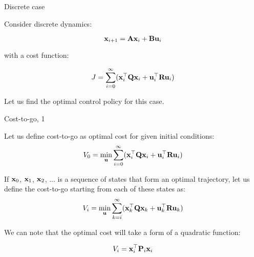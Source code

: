 \documentclass{beamer}
\begin{document}
\begin{frame}{Discrete case}
	\begin{flushleft}
		
		Consider discrete dynamics:
		
		\begin{equation}
			\mathbf{x}_{i+1} = \mathbf{A}\mathbf{x}_i + \mathbf{B}\mathbf{u}_i
		\end{equation}
		
		with a cost function:
		
		\begin{equation}
			J = \sum_{i=0}^\infty (\mathbf{x}_i^\top \mathbf{Q} \mathbf{x}_i +  \mathbf{u}_i^\top \mathbf{R} \mathbf{u}_i)
		\end{equation}
		
		Let us find the optimal control policy for this case.
		
		
	\end{flushleft}
\end{frame}



\begin{frame}{Cost-to-go, 1}
	\begin{flushleft}
		
		Let us define cost-to-go as optimal cost for given initial conditions:
		\begin{equation}
			V_0 = \underset{\mathbf{u}}{\text{min}} \sum_{i=0}^\infty (\mathbf{x}_i^\top \mathbf{Q} \mathbf{x}_i +  \mathbf{u}_i^\top \mathbf{R} \mathbf{u}_i)
		\end{equation}
		
		If $\mathbf{x}_0$, $\mathbf{x}_1$, $\mathbf{x}_2$, ... is a sequence of states that form an optimal trajectory, let us define the cost-to-go starting from each of these states as:
		\begin{equation}
			V_i =  \underset{\mathbf{u}}{\text{min}} \sum_{k = i}^\infty (\mathbf{x}_k^\top \mathbf{Q} \mathbf{x}_k +  \mathbf{u}_k^\top \mathbf{R} \mathbf{u}_k)
		\end{equation}
		
		We can note that the optimal cost will take a form of a quadratic function:
		
		\begin{equation}
			V_i = \mathbf{x}_i^\top \mathbf{P}_i \mathbf{x}_i
		\end{equation}
		
		
		
	\end{flushleft}
\end{frame}
\end{document}
